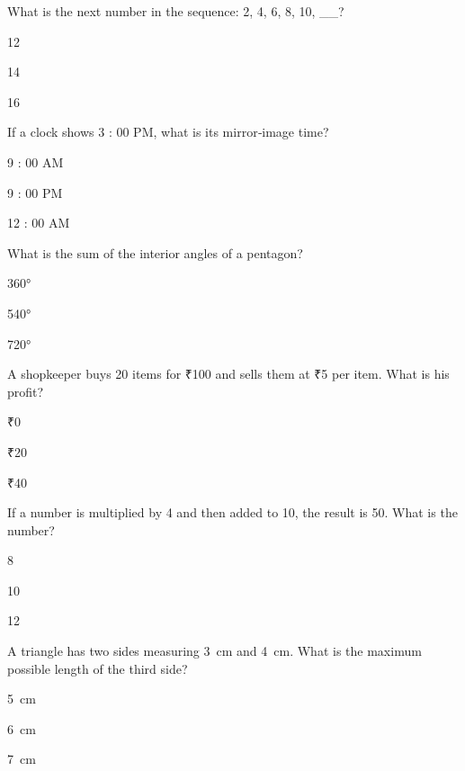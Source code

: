 \begin{enhancedmcq}{What is the next number in the sequence: 2, 4, 6, 8, 10, __?}
\item 12
\item 14
\item 16

\end{enhancedmcq}
\begin{enhancedmcq}{If a clock shows 3 : 00 PM, what is its mirror‑image time?}
\item 9 : 00 AM
\item 9 : 00 PM
\item 12 : 00 AM

\end{enhancedmcq}
\begin{enhancedmcq}{What is the sum of the interior angles of a pentagon?}
\item 360°
\item 540°
\item 720°

\end{enhancedmcq}
\begin{enhancedmcq}{A shopkeeper buys 20 items for ₹100 and sells them at ₹5 per item. What is his profit?}
\item ₹0
\item ₹20
\item ₹40

\end{enhancedmcq}
\begin{enhancedmcq}{If a number is multiplied by 4 and then added to 10, the result is 50. What is the number?}
\item 8
\item 10
\item 12

\end{enhancedmcq}
\begin{enhancedmcq}{A triangle has two sides measuring 3 cm and 4 cm. What is the maximum possible length of the third side?}
\item 5 cm
\item 6 cm
\item 7 cm

\end{enhancedmcq}

